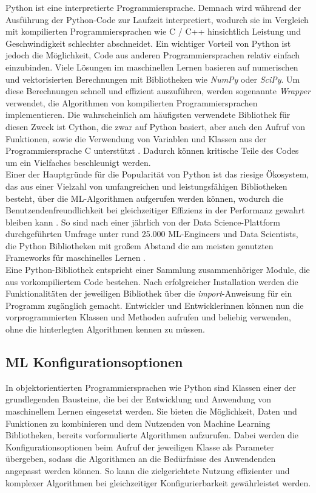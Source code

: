 \documentclass[german,bachelor]{swsLeipzig}
\begin{document}
Python ist eine interpretierte Programmiersprache.
Demnach wird während der Ausführung der Python-Code zur Laufzeit interpretiert, wodurch sie im Vergleich mit kompilierten
Programmiersprachen wie C / C++ hinsichtlich Leistung und Geschwindigkeit schlechter abschneidet.
Ein wichtiger Vorteil von Python ist jedoch die Möglichkeit, Code aus anderen Programmiersprachen relativ einfach einzubinden.
Viele Lösungen im maschinellen Lernen basieren auf numerischen und vektorisierten Berechnungen mit Bibliotheken
wie \textit{NumPy} oder \textit{SciPy}.
Um diese Berechnungen schnell und effizient auszuführen, werden sogenannte \textit{Wrapper} verwendet,
die Algorithmen von kompilierten Programmiersprachen implementieren.
Die wahrscheinlich am häufigsten verwendete Bibliothek für diesen Zweck ist Cython, die zwar auf Python basiert,
aber auch den Aufruf von Funktionen, sowie die Verwendung von Variablen und Klassen aus der Programmiersprache C unterstützt \cite[]{8757088}.
Dadurch können kritische Teile des Codes um ein Vielfaches beschleunigt werden. \\

Einer der Hauptgründe für die Popularität von Python ist das riesige Ökosystem, das aus einer Vielzahl
von umfangreichen und leistungsfähigen Bibliotheken besteht, über die ML-Algorithmen aufgerufen werden können,
wodurch die Benutzendenfreundlichkeit bei gleichzeitiger Effizienz in der Performanz gewahrt bleiben kann \cite[]{2020}.
So sind nach einer jährlich von der Data Science-Plattform \citeauthor{kaggle} durchgeführten Umfrage unter rund 25.000 ML-Engineers
und Data Scientists, die Python Bibliotheken mit großem Abstand die am meisten genutzten Frameworks für maschinelles Lernen \cite[]{kaggle}.\\

Eine Python-Bibliothek entspricht einer Sammlung zusammenhöriger Module, die aus vorkompiliertem Code bestehen.
Nach erfolgreicher Installation werden die Funktionalitäten der jeweiligen Bibliothek über die \textit{import}-Anweisung für ein Programm zugänglich
gemacht.
Entwickler und Entwicklerinnen können nun die vorprogrammierten Klassen und Methoden aufrufen und beliebig verwenden,
ohne die hinterlegten Algorithmen kennen zu müssen.

\subsection{ML Konfigurationsoptionen} \label{ML Konfigurationsoptionen}
In objektorientierten Programmiersprachen wie Python sind Klassen einer der grundlegenden Bausteine, die bei der Entwicklung und Anwendung
von maschinellem Lernen eingesetzt werden.
Sie bieten die Möglichkeit, Daten und Funktionen zu kombinieren und dem Nutzenden von Machine Learning Bibliotheken,
bereits vorformulierte Algorithmen aufzurufen.
Dabei werden die Konfigurationsoptionen beim Aufruf der jeweiligen Klasse als Parameter übergeben, sodass die Algorithmen
an die Bedürfnisse des Anwendenden angepasst werden können.
So kann die zielgerichtete Nutzung effizienter und komplexer Algorithmen bei gleichzeitiger Konfigurierbarkeit gewährleistet werden. \\
\end{document}
